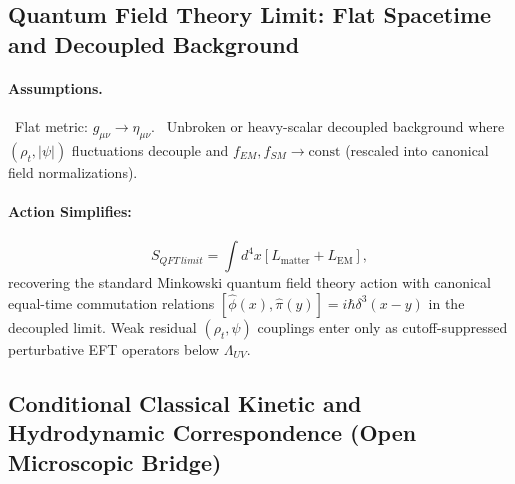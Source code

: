 \documentclass[american,11pt,letterpaper]{article}
\def\mathcal#1{#1}%
\def\mathrm#1{#1}%
\begin{document}
\subsection{Quantum Field Theory Limit: Flat Spacetime and Decoupled Background}
\label{app:QFTlimit}

\paragraph{Assumptions.}
\noindent\textbullet~Flat metric: $g_{\mu\nu} \to \eta_{\mu\nu}$.
\noindent\textbullet~Unbroken or heavy-scalar decoupled background where $(\rho_t, |\psi|)$ fluctuations decouple and $f_{\mathrm{EM}}, f_{\mathrm{SM}} \to \text{const}$ (rescaled into canonical field normalizations).

\paragraph{Action Simplifies:}
\[
S_{\mathrm{QFT\,limit}} = \int d^4x \left[
    \mathcal{L}_{\text{matter}} + \mathcal{L}_{\text{EM}}
\right],
\]
recovering the standard Minkowski quantum field theory action with canonical equal-time commutation relations $[\hat{\phi}(x), \hat{\pi}(y)] = i \hbar \delta^3(x - y)$ in the decoupled limit. Weak residual $(\rho_t, \psi)$ couplings enter only as cutoff-suppressed perturbative EFT operators below $\Lambda_{\mathrm{UV}}$.

\subsection{Conditional Classical Kinetic and Hydrodynamic Correspondence (Open Microscopic Bridge)}
\label{app:KineticLimit}
\end{document}
